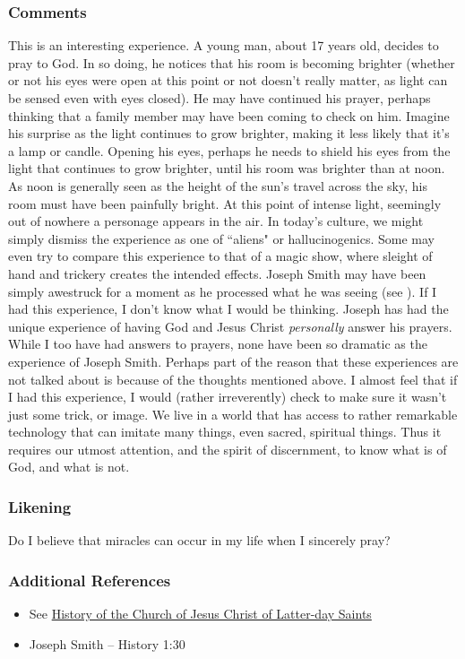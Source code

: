 \documentclass[12pt]{report}
\begin{document}
\subsubsection{Comments\label{js:comments3}}
This is an interesting experience.  A young man, about 17 years old, decides to pray to God.  In so doing, he notices that his room is becoming brighter (whether or not his eyes were open at this point or not doesn't really matter, as light can be sensed even with eyes closed).  He may have continued his prayer, perhaps thinking that a family member may have been coming to check on him.  Imagine his surprise as the light continues to grow brighter, making it less likely that it's a lamp or candle.  Opening his eyes, perhaps he needs to shield his eyes from the light that continues to grow brighter, until his room was brighter than at noon.  As noon is generally seen as the height of the sun's travel across the sky, his room must have been painfully bright.  At this point of intense light, seemingly out of nowhere a personage appears in the air.  In today's culture, we might simply dismiss the experience as one of ``aliens" or hallucinogenics.  Some may even try to compare this experience to that of a magic show, where sleight of hand and trickery creates the intended effects. Joseph Smith may have been simply awestruck for a moment as he processed what he was seeing (see ). If I had this experience, I don't know what I would  be thinking.  Joseph has had the unique experience of having God and Jesus Christ \emph{personally} answer his prayers.  While I too have had answers to prayers, none have been so dramatic as the experience of Joseph Smith.  Perhaps part of the reason that these experiences are not talked about is because of the thoughts mentioned above.  I almost feel that if I had this experience, I would (rather irreverently) check to make sure it wasn't just some trick, or image.  We live in a world that has access to rather remarkable technology that can imitate many things, even sacred, spiritual things.  Thus it requires our utmost attention, and the spirit of discernment, to know what is of God, and what is not.

\subsubsection{Likening\label{js:likening3}}
Do I believe that miracles can occur in my life when I sincerely pray?

\subsubsection{Additional References\label{js:references3}}
\begin{itemize}
\item See \href{https://byustudies.byu.edu/history-of-the-church}{History of the Church of Jesus Christ of Latter-day Saints}
\item Joseph Smith -- History 1:30
\end{itemize}
\end{document}
